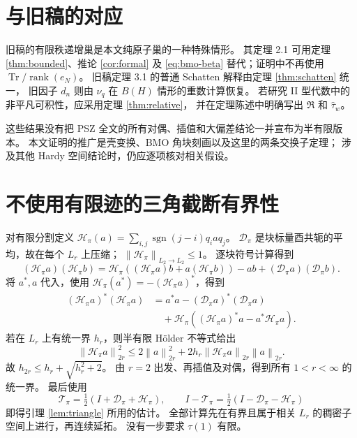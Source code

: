 \documentclass[UTF8,11pt,a4paper,fontset=fandol]{ctexart}
\theoremstyle{remark}
\numberwithin{equation}{section}
\newcommand{\T}{\mathcal T}
\newcommand{\D}{\mathcal D}
\newcommand{\Tr}{\operatorname{Tr}}
\newcommand{\norm}[1]{\left\lVert #1\right\rVert}
\DeclareMathOperator{\rank}{rank}
\begin{document}
\section{与旧稿的对应}

旧稿的有限秩递增巢是本文纯原子巢的一种特殊情形。
其定理 2.1 可用定理 \ref{thm:bounded}、推论 \ref{cor:formal} 及
\eqref{eq:bmo-beta} 替代；证明中不再使用 $\Tr/\rank(e_N)$。
旧稿定理 3.1 的普通 Schatten 解释由定理 \ref{thm:schatten} 统一，
旧因子 $d_n$ 则由 $\nu_q$ 在 $B(H)$ 情形的重数计算恢复。
若研究 II 型代数中的非平凡可积性，应采用定理 \ref{thm:relative}，
并在定理陈述中明确写出 $\mathfrak R$ 和 $\widehat\tau_w$。

这些结果没有把 PSZ 全文的所有对偶、插值和大偏差结论一并宣布为半有限版本。
本文证明的推广是壳变换、BMO 角块刻画以及这里的两条交换子定理；
涉及其他 Hardy 空间结论时，仍应逐项核对相关假设。

\appendix
\section{不使用有限迹的三角截断有界性}

对有限分割定义
$\mathcal H_\pi(a)=\sum_{i,j}\operatorname{sgn}(j-i)q_i a q_j$。
$\D_\pi$ 是块标量酉共轭的平均，故在每个 $L_r$ 上压缩；
$\norm{\mathcal H_\pi}_{L_2\to L_2}\leq1$。
逐块符号计算得到
\[
 (\mathcal H_\pi a)(\mathcal H_\pi b)
 =\mathcal H_\pi((\mathcal H_\pi a)b+a(\mathcal H_\pi b))
  -ab+(\D_\pi a)(\D_\pi b).
\]
将 $a^*,a$ 代入，使用 $\mathcal H_\pi(a^*)=-(\mathcal H_\pi a)^*$，得到
\begin{align*}
 (\mathcal H_\pi a)^*(\mathcal H_\pi a)
 &=a^*a-(\D_\pi a)^*(\D_\pi a)\\
 &\quad+\mathcal H_\pi((\mathcal H_\pi a)^*a-a^*\mathcal H_\pi a).
\end{align*}
若在 $L_r$ 上有统一界 $h_r$，则半有限 H\"older 不等式给出
\[
 \norm{\mathcal H_\pi a}_{2r}^2
 \leq2\norm a_{2r}^2+2h_r\norm{\mathcal H_\pi a}_{2r}\norm a_{2r}.
\]
故 $h_{2r}\leq h_r+\sqrt{h_r^2+2}$。
由 $r=2$ 出发、再插值及对偶，得到所有 $1<r<\infty$ 的统一界。
最后使用
\[
 \T_\pi=\tfrac12(I+\D_\pi+\mathcal H_\pi),\qquad
 I-\T_\pi=\tfrac12(I-\D_\pi-\mathcal H_\pi)
\]
即得引理 \ref{lem:triangle} 所用的估计。
全部计算先在有界且属于相关 $L_r$ 的稠密子空间上进行，再连续延拓。
没有一步要求 $\tau(1)$ 有限。
\end{document}
